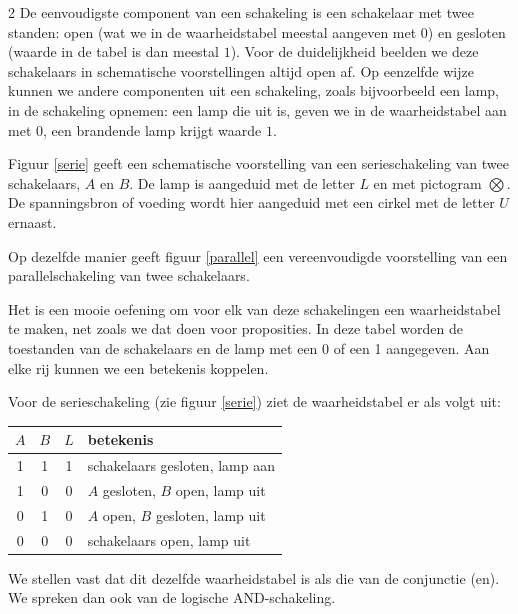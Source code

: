 \begin{multicols}{2}
De eenvoudigste component van een schakeling is een schakelaar met twee standen: open (wat we in de waarheidstabel meestal aangeven met $0$) en gesloten (waarde in de tabel is dan meestal $1$). Voor de duidelijkheid beelden we deze schakelaars in schematische voorstellingen altijd open af.  Op eenzelfde wijze kunnen we andere componenten uit een schakeling, zoals bijvoorbeeld een lamp, in de schakeling opnemen: een lamp die uit is, geven we in de waarheidstabel aan met $0$, een brandende lamp krijgt waarde $1$.



Figuur \ref{serie} geeft een schematische voorstelling van een serieschakeling van twee schakelaars, $A$ en $B$. De lamp is aangeduid met de letter $L$ en met pictogram $\bigotimes$. De spanningsbron of voeding wordt hier aangeduid met een cirkel met de letter $U$ ernaast.

Op dezelfde manier geeft figuur \ref{parallel} een vereenvoudigde voorstelling van een parallelschakeling van twee schakelaars.


Het is een mooie oefening om voor elk van deze schakelingen een waarheidstabel te maken, net zoals we dat doen voor proposities. In deze tabel worden de toestanden van de schakelaars en de lamp met een 0 of een 1
aangegeven. Aan elke rij kunnen we een betekenis koppelen.

Voor de serieschakeling (zie figuur \ref{serie}) ziet de waarheidstabel er als volgt uit:

\begin{center}
\begin{tabular}{c|c|c|l}  
$A$ & $B$ & $L$ & betekenis\\
\hline
1 & 1 & 1 & schakelaars gesloten, lamp aan\\
1 & 0 & 0 & $A$ gesloten, $B$ open, lamp uit\\
0 & 1 & 0 & $A$ open, $B$ gesloten, lamp uit\\
0 & 0 & 0 & schakelaars open, lamp uit
\end{tabular}
\label{tabelserie}
\end{center}

We stellen vast dat dit dezelfde waarheidstabel is als die van de conjunctie (en). We spreken dan ook van de logische AND-schakeling.


\end{multicols}
